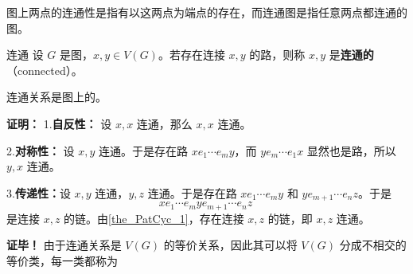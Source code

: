 图上两点的连通性是指有以这两点为端点的存在，而连通图是指任意两点都连通的图。

\begin{definition}{连通}
设 $G$ 是图，$x,y\in V(G)$。若存在连接 $x,y$ 的路，则称 $x,y$ 是\textbf{连通的}（connected）。
\end{definition}

\begin{theorem}{}
连通关系是图上的。
\end{theorem}
\textbf{证明：}
1.\textbf{自反性：} 设 $x,x$ 连通，那么 $x,x$ 连通。

2.\textbf{对称性：} 设 $x,y$ 连通。于是存在路 $xe_1\cdots e_m y$，而 $ye_m\cdots e_1 x$ 显然也是路，所以 $y,x$ 连通。

3.\textbf{传递性：}设 $x,y$ 连通，$y,z$ 连通。于是存在路 $xe_1\cdots e_m y$ 和 $ye_{m+1}\cdots e_{n}z$。于是
\begin{equation}
xe_1\cdots e_m ye_{m+1}\cdots e_{n}z~
\end{equation}
是连接 $x,z$ 的链。由\autoref{the_PatCyc_1}，存在连接 $x,z$ 的链，即 $x,z$ 连通。

\textbf{证毕！}
由于连通关系是 $V(G)$ 的等价关系，因此其可以将 $V(G)$ 分成不相交的等价类，每一类都称为 $$
\begin{corollary}{}

\end{corollary}












